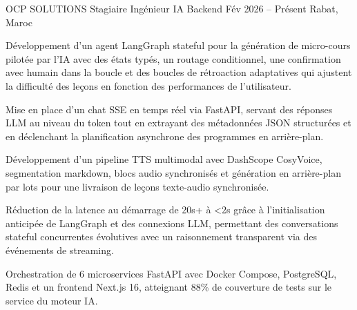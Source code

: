 \documentclass[11pt, a4paper]{awesome-cv}
\begin{document}
\vspace{0.1cm}
\cventry
  {OCP SOLUTIONS}
  {Stagiaire Ingénieur IA Backend }
  {Fév 2026 -- Présent}
  {Rabat, Maroc}
  {
    \begin{cvitems}
      \item {Développement d'un agent LangGraph stateful pour la génération de micro-cours pilotée par l'IA avec des états typés, un routage conditionnel, une confirmation avec humain dans la boucle et des boucles de rétroaction adaptatives qui ajustent la difficulté des leçons en fonction des performances de l'utilisateur.}
      \item {Mise en place d'un chat SSE en temps réel via FastAPI, servant des réponses LLM au niveau du token tout en extrayant des métadonnées JSON structurées et en déclenchant la planification asynchrone des programmes en arrière-plan.}
      \item {Développement d'un pipeline TTS multimodal avec DashScope CosyVoice, segmentation markdown, blocs audio synchronisés et génération en arrière-plan par lots pour une livraison de leçons texte-audio synchronisée.}
      \item {Réduction de la latence au démarrage de 20s+ à <2s grâce à l'initialisation anticipée de LangGraph et des connexions LLM, permettant des conversations stateful concurrentes évolutives avec un raisonnement transparent via des événements de streaming.}
      \item {Orchestration de 6 microservices FastAPI avec Docker Compose, PostgreSQL, Redis et un frontend Next.js 16, atteignant 88\% de couverture de tests sur le service du moteur IA.}
    \end{cvitems}
  }
\end{document}
